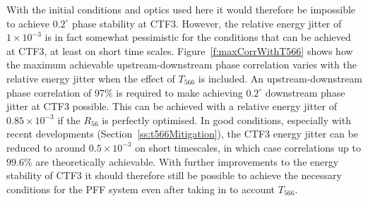 With the initial conditions and optics used here it would therefore be impossible to achieve \(0.2^\circ\) phase stability at CTF3. However, the relative energy jitter of \(1\times10^{-3}\) is in fact somewhat pessimistic for the conditions that can be achieved at CTF3, at least on short time scales. Figure~\ref{f:maxCorrWithT566} shows how the maximum achievable upstream-downstream phase correlation varies with the relative energy jitter when the effect of \(T_{566}\) is included. An upstream-downstream phase correlation of 97\% is required to make achieving \(0.2^\circ\) downstream phase jitter at CTF3 possible. This can be achieved with a relative energy jitter of \(0.85\times10^{-3}\) if the \(R_{56}\) is perfectly optimised. In good conditions, especially with recent developments (Section~\ref{ss:t566Mitigation}), the CTF3 energy jitter can be reduced to around \(0.5\times10^{-3}\) on short timescales, in which case correlations up to \(99.6\%\) are theoretically achievable. With further improvements to the energy stability of CTF3 it should therefore still be possible to achieve the necessary conditions for the PFF system even after taking in to account \(T_{566}\).

